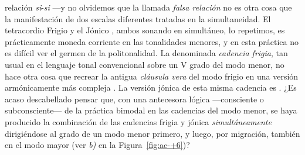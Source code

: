 \documentclass[a4paper,11pt]{article}
\begin{document}
\begin{multicols}{2}
relación \emph{si\bemoltxt}-\emph{si\becuadrotxt} ---y no olvidemos que la llamada \emph{falsa relación} no es otra cosa que la manifestación de dos escalas diferentes tratadas en la simultaneidad. El tetracordio Frigio  y el Jónico \hbox{,} ambos sonando en simultáneo, lo repetimos, es prácticamente moneda corriente en las tonalidades menores, y en esta práctica no es difícil ver el germen de la politonalidad. La denominada \emph{cadencia frigia}, tan usual en el lenguaje tonal convencional sobre un V grado del modo menor, no hace otra cosa que recrear la antigua \emph{cláusula vera} del modo frigio  en una versión armónicamente más compleja \hbox{.} La versión jónica de esta misma cadencia es \hbox{.} ¿Es acaso descabellado pensar que, con una antecesora lógica ---consciente o subconsciente--- de la práctica bimodal en las cadencias del modo menor, se haya producido la combinación de las cadencias frigia y jónica \emph{simultáneamente} dirigiéndose al  grado de un modo menor primero, y luego, por migración, también en el modo mayor (ver \emph{b)} en la Figura~\ref{fig:ac-+6})?
\end{multicols}
\end{document}
